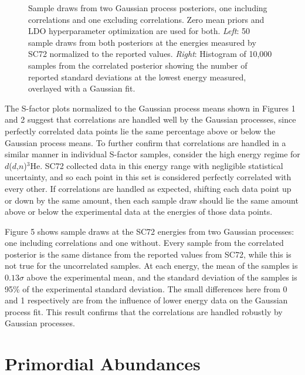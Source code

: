 \documentclass[%
 reprint,
superscriptaddress,
nofootinbib,
 amsmath,amssymb,
 aps,
 pra,
]{revtex4-2}
\begin{document}
\begin{figure}
\begin{minipage}{.48\textwidth}
    	\end{minipage}
	\caption{Sample draws from two Gaussian process posteriors, one including correlations and one excluding correlations. Zero mean priors and LDO hyperparameter optimization are used for both. \textit{Left}: 50 sample draws from both posteriors at the energies measured by SC72 \cite{Schulte1972} normalized to the reported values. \textit{Right}: Histogram of 10,000 samples from the correlated posterior showing the number of reported standard deviations at the lowest energy measured, overlayed with a Gaussian fit. }
\end{figure}

The S-factor plots normalized to the Gaussian process means shown in Figures 1 and 2 suggest that correlations are handled well by the Gaussian processes, since perfectly correlated data points lie the same percentage above or below the Gaussian process means. To further confirm that correlations are handled in a similar manner in individual S-factor samples, consider the high energy regime for $d$($d$,$n$)$^3$He. SC72 \cite{Schulte1972} collected data in this energy range with negligible statistical uncertainty, and so each point in this set is considered perfectly correlated with every other. If correlations are handled as expected, shifting each data point up or down by the same amount, then each sample draw should lie the same amount above or below the experimental data at the energies of those data points. 

Figure 5 shows sample draws at the SC72 energies from two Gaussian processes: one including correlations and one without. Every sample from the correlated posterior is the same distance from the reported values from SC72, while this is not true for the uncorrelated samples. At each energy, the mean of the samples is $0.13\sigma$ above the experimental mean, and the standard deviation of the samples is 95\% of the experimental standard deviation. The small differences here from 0 and 1 respectively are from the influence of lower energy data on the Gaussian process fit. This result confirms that the correlations are handled robustly by Gaussian processes. 



\section{Primordial Abundances}
\end{document}
